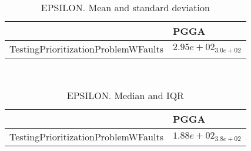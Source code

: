\documentclass{article}
\begin{document}
\
\begin{table}
\caption{EPSILON. Mean and standard deviation}
\label{table:mean.EPSILON}
\centering
\begin{scriptsize}
\begin{tabular}{ll}
\hline &  PGGA\\
\hline
TestingPrioritizationProblemWFaults & \cellcolor{gray95}$  2.95e+02_{ 3.0e+02}$ \\
\hline
\end{tabular}
\end{scriptsize}
\end{table}
\
\begin{table}
\caption{EPSILON. Median and IQR}
\label{table:median.EPSILON}
\begin{scriptsize}
\centering
\begin{tabular}{ll}
\hline &  PGGA\\
\hline
TestingPrioritizationProblemWFaults & \cellcolor{gray95}$  1.88e+02_{ 3.8e+02}$ \\
\hline
\end{tabular}
\end{scriptsize}
\end{table}
\end{document}
